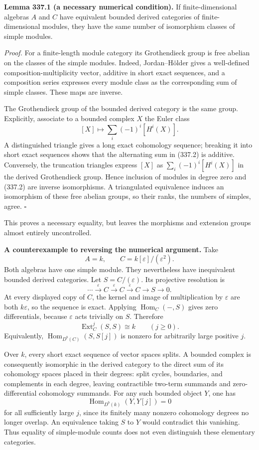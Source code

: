 \documentclass[11pt]{article}
\begin{document}
\textbf{Lemma 337.1 (a necessary numerical condition).} If finite-dimensional algebras $A$ and $C$ have equivalent bounded derived categories of finite-dimensional modules, they have the same number of isomorphism classes of simple modules.

\emph{Proof.} For a finite-length module category its Grothendieck group is free abelian on the classes of the simple modules. Indeed, Jordan--Hölder gives a well-defined composition-multiplicity vector, additive in short exact sequences, and a composition series expresses every module class as the corresponding sum of simple classes. These maps are inverse.

The Grothendieck group of the bounded derived category is the same group. Explicitly, associate to a bounded complex $X$ the Euler class
\[
 [X]\longmapsto\sum_i(-1)^i[H^i(X)].
 \tag{337.2}
\]
A distinguished triangle gives a long exact cohomology sequence; breaking it into short exact sequences shows that the alternating sum in (337.2) is additive. Conversely, the truncation triangles express $[X]$ as $\sum_i(-1)^i[H^i(X)]$ in the derived Grothendieck group. Hence inclusion of modules in degree zero and (337.2) are inverse isomorphisms. A triangulated equivalence induces an isomorphism of these free abelian groups, so their ranks, the numbers of simples, agree. $\square$

This proves a necessary equality, but leaves the morphisms and extension groups almost entirely uncontrolled.

\textbf{A counterexample to reversing the numerical argument.} Take
\[
 A=k,\qquad C=k[\varepsilon]/(\varepsilon^2).
\]
Both algebras have one simple module. They nevertheless have inequivalent bounded derived categories. Let $S=C/(\varepsilon)$. Its projective resolution is
\[
 \cdots\xrightarrow{\varepsilon}C\xrightarrow{\varepsilon}C
 \xrightarrow{\varepsilon}C\longrightarrow S\longrightarrow0.
 \tag{337.3}
\]
At every displayed copy of $C$, the kernel and image of multiplication by $\varepsilon$ are both $k\varepsilon$, so the sequence is exact. Applying $\operatorname{Hom}_C(-,S)$ gives zero differentials, because $\varepsilon$ acts trivially on $S$. Therefore
\[
 \operatorname{Ext}^j_C(S,S)\cong k\qquad(j\geq0).
\]
Equivalently, $\operatorname{Hom}_{D^b(C)}(S,S[j])$ is nonzero for arbitrarily large positive $j$.

Over $k$, every short exact sequence of vector spaces splits. A bounded complex is consequently isomorphic in the derived category to the direct sum of its cohomology spaces placed in their degrees: split cycles, boundaries, and complements in each degree, leaving contractible two-term summands and zero-differential cohomology summands. For any such bounded object $Y$, one has
\[
 \operatorname{Hom}_{D^b(k)}(Y,Y[j])=0
\]
for all sufficiently large $j$, since its finitely many nonzero cohomology degrees no longer overlap. An equivalence taking $S$ to $Y$ would contradict this vanishing. Thus equality of simple-module counts does not even distinguish these elementary categories.
\end{document}
